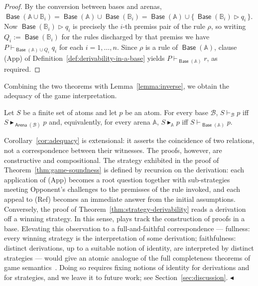 \documentclass{lipics-v2021}
\newcommand{\fillBox}{\hfill$\blacktriangleleft$}
\newcommand{\deriv}[1]{\vdash_{#1}}       %
\newcommand{\supp}[1]{\Vdash_{#1}}
\newcommand{\wstrat}[1]{\blacktriangleright_{#1}}            %
\newcommand{\base}[1]{\mathcal{#1}}                    %
\newcommand{\arena}[1]{\mathbb{#1}}                     %
\newcommand{\brule}[1]{\triangleright{#1}}         %
\newcommand{\tobase}[1]{\mathrel{\textsf{Base}}(#1)}            %
\newcommand{\toarena}[1]{\mathrel{\textsf{Arena}}(#1)}           %
\begin{document}
\begin{proof}
By the conversion between bases and arenas,
$\tobase{\arena{A} \cup \arena{B}_i}
     = \tobase{\arena{A}} \cup \tobase{\arena{B}_i}
     = \tobase{\arena{A}} \cup \{\, \tobase{\arena{B}_i} \brule q_i \,\}$.
Now $\tobase{\arena{B}_i} \brule q_i$ is precisely the $i$-th premiss pair of
the rule $\rho$, so writing $Q_i := \tobase{\arena{B}_i}$ for the rules
discharged by that premiss we have
$P \deriv{\tobase{\arena{A}} \cup Q_i} q_i$ for each $i = 1, \ldots, n$.
Since $\rho$ is a rule of $\tobase{\arena{A}}$, clause (App) of
Definition~\ref{def:derivability-in-a-base} yields
$P \deriv{\tobase{\arena{A}}} r$, as required.
\end{proof}
 
Combining the two theorems with Lemma~\ref{lemma:inverse}, we obtain the
adequacy of the game interpretation.
\begin{corollary}[Adequacy]
\label{cor:adequacy}
Let $S$ be a finite set of atoms and let $p$ be an atom. For every base $\base{B}$,
$S \deriv{\base{B}} p$ iff $S \wstrat{\toarena{\base{B}}} p$
and, equivalently, for every arena $\arena{A}$,
$S \wstrat{\arena{A}} p$ iff $S \deriv{\tobase{\arena{A}}} p$.
\end{corollary}
\begin{remark}[Faithfulness]
\label{rem:faithfulness}
Corollary~\ref{cor:adequacy} is extensional: it asserts the coincidence of
two relations, not a correspondence between their witnesses. The proofs,
however, are constructive and compositional. The strategy exhibited in the
proof of Theorem~\ref{thm:game-soundness} is defined by recursion on the
derivation: each application of (App) becomes a root question together with
sub-strategies meeting Opponent's challenges to the premisses of the rule
invoked, and each appeal to (Ref) becomes an immediate answer from the
initial assumptions. Conversely, the proof of
Theorem~\ref{thm:strategy-derivability} reads a derivation off a winning
strategy. In this sense, plays track the construction of proofs in a base.
Elevating this observation to a full-and-faithful correspondence ---
fullness: every winning strategy is the interpretation of some derivation;
faithfulness: distinct derivations, up to a suitable notion of identity, are
interpreted by distinct strategies --- would give an atomic analogue of the
full completeness theorems of game
semantics~\cite{AbramskyJagadeesan1994,HYLAND2000285}. Doing so requires
fixing notions of identity for derivations and for strategies, and we leave
it to future work; see Section~\ref{sec:discussion}. \fillBox
\end{remark}
 
\end{document}
